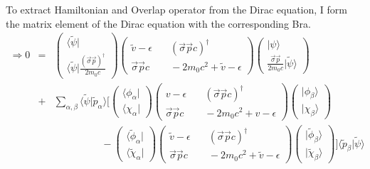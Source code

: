 \documentclass[11pt,a4paper]{report}
\begin{document}
To extract Hamiltonian and Overlap operator from the Dirac equation, I
form the matrix element of the Dirac equation with the corresponding
Bra.
\begin{eqnarray}
\Rightarrow
0&=&\left(\begin{array}{c}\langle\tilde{\psi}|\\
\langle\tilde{\psi}|\frac{(\vec{\sigma}\vec{p})^\dagger}{2m_0c}\end{array}\right)
\left(\begin{array}{cc}
\tilde{v}-\epsilon &\quad (\vec{\sigma}\vec{p}c)^\dagger \\
\vec{\sigma}\vec{p}c &\quad -2m_0c^2+\tilde{v}-\epsilon\end{array}\right)
\left(\begin{array}{c}|\psi\rangle\\
\frac{\vec{\sigma}\vec{p}}{2m_0c}|\tilde{\psi}\rangle\end{array}\right)
\nonumber\\
&+&\sum_{\alpha,\beta}\langle\tilde{\psi}|\tilde{p}_\alpha\rangle
\biggl[
%
\left(\begin{array}{c}\langle\phi_\alpha|\\
\langle\chi_\alpha|
\end{array}\right)
\left(\begin{array}{cc}
v-\epsilon &\quad (\vec{\sigma}\vec{p}c)^\dagger\\
\vec{\sigma}\vec{p}c &\quad -2m_0c^2+v-\epsilon\end{array}\right)
\left(\begin{array}{c}|\phi_\beta\rangle\\
|\chi_\beta\rangle\end{array}\right)
%
\nonumber\\
&&\hspace{2cm}-\left(\begin{array}{c}\langle\tilde{\phi}_\alpha|\\
\langle\tilde{\chi}_\alpha|
\end{array}\right)
\left(\begin{array}{cc}
\tilde{v}-\epsilon &\quad (\vec{\sigma}\vec{p}c)^\dagger\\
\vec{\sigma}\vec{p}c &\quad -2m_0c^2+\tilde{v}-\epsilon\end{array}\right)
\left(\begin{array}{c}|\tilde{\phi}_\beta\rangle\\
|\tilde{\chi}_\beta\rangle\end{array}\right)
%
\biggr]
\langle\tilde{p}_\beta|\tilde{\psi}\rangle

\end{eqnarray}
\end{document}
